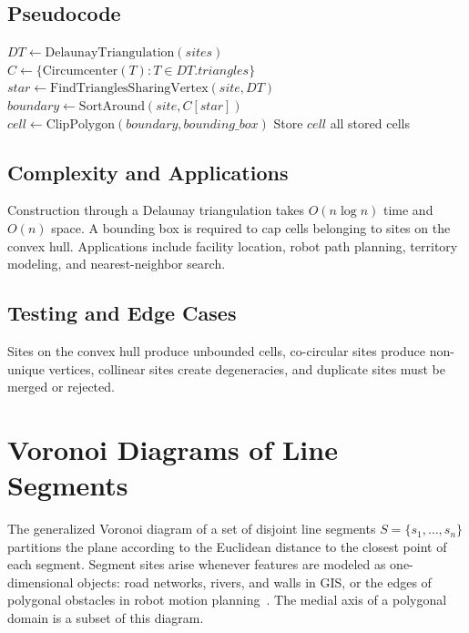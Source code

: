

\subsection{Pseudocode}

\begin{algorithm}[htbp]
\caption{Voronoi Diagram via Delaunay Dual}
\label{alg:voronoi}
\begin{algorithmic}[1]
  \State $DT \gets \text{DelaunayTriangulation}(sites)$
  \State $C \gets \{\text{Circumcenter}(T) : T \in DT.triangles\}$
    \State $star \gets \text{FindTrianglesSharingVertex}(site, DT)$
    \State $boundary \gets \text{SortAround}(site, C[star])$
    \State $cell \gets \text{ClipPolygon}(boundary, bounding\_box)$
    \State Store $cell$
  \EndFor
  \State \Return all stored cells
\EndFunction
\end{algorithmic}
\end{algorithm}

\subsection{Complexity and Applications}

Construction through a Delaunay triangulation takes $O(n\log n)$ time and
$O(n)$ space. A bounding box is required to cap cells belonging to sites on
the convex hull. Applications include facility location, robot path planning,
territory modeling, and nearest-neighbor search.

\subsection{Testing and Edge Cases}

Sites on the convex hull produce unbounded cells, co-circular sites produce
non-unique vertices, collinear sites create degeneracies, and duplicate sites
must be merged or rejected.

\section{Voronoi Diagrams of Line Segments}
\label{sec:voronoi_segments}

The generalized Voronoi diagram of a set of disjoint line segments
$S = \{s_1, \dots, s_n\}$ partitions the plane according to the Euclidean
distance to the closest point of each segment. Segment sites arise whenever
features are modeled as one-dimensional objects: road networks, rivers, and
walls in GIS, or the edges of polygonal obstacles in robot motion
planning~\cite{leedrysdale1981,okabe2000}. The medial axis of a polygonal
domain is a subset of this diagram.

